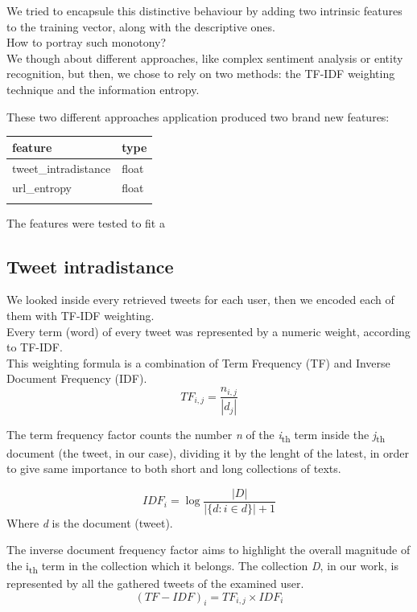 We tried to encapsule this distinctive behaviour by adding two intrinsic features to the training vector, along with the descriptive ones.\\

How to portray such monotony?\\
We though about different approaches, like complex sentiment analysis or entity recognition, but then, we chose to rely on two methods: the TF-IDF weighting technique and the information entropy.

These two different approaches application produced two brand new features:
\small
\begin{center}
	\begin{tabular}{ll}
		\\feature&type\\
		\hline\hline
		tweet\_intradistance&float\\
		url\_entropy&float\\\hline\\
	\end{tabular}
\end{center}
\normalsize

The features were tested to fit a 

\subsection{Tweet intradistance}
We looked inside every retrieved tweets for each user, then we encoded each of them with TF-IDF weighting.\\

Every term (word) of every tweet was represented by a numeric weight, according to TF-IDF.\\
This weighting formula is a combination of Term Frequency (TF) and Inverse Document Frequency (IDF).
\[ TF_{i,j} =\frac {n_{i,j}}{|d_{j}|} \]

The term frequency factor counts the number \textit{n} of the \textit{i}\textsubscript{th} term inside the \textit{j}\textsubscript{th} document (the tweet, in our case), dividing it by the lenght of the latest, in order to give same importance to both short and long collections of texts.

\[ IDF_{i} =\log {\frac {|D|}{|\{d:i\in d\}| + 1}} \]
Where \textit{d} is the document (tweet).

The inverse document frequency factor aims to highlight the overall magnitude of the  i\textsubscript{th} term in the collection  which it belongs. The collection \textit{D}, in our work, is represented by all the gathered tweets of the examined user.
\[(TF-IDF)_{i} = TF_{i,j} \times IDF_{i} \]

